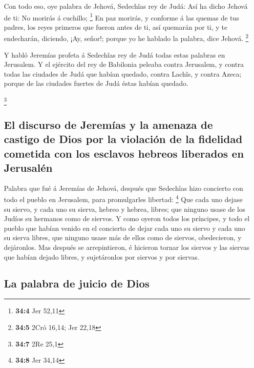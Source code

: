  Con todo eso, oye palabra de Jehová, Sedechîas rey de Judá:
Así ha dicho Jehová de ti: No morirás á cuchillo; \footnote{\textbf{34:4}
  Jer 52,11}  En paz morirás, y conforme á las quemas de tus
padres, los reyes primeros que fueron antes de ti, así quemarán por ti,
y te endecharán, diciendo, ¡Ay, señor!; porque yo he hablado la palabra,
dice Jehová. \footnote{\textbf{34:5} 2Cró 16,14; Jer 22,18}

 Y habló Jeremías profeta á Sedechîas rey de Judá todas
estas palabras en Jerusalem.  Y el ejército del rey de
Babilonia peleaba contra Jerusalem, y contra todas las ciudades de Judá
que habían quedado, contra Lachîs, y contra Azeca; porque de las
ciudades fuertes de Judá éstas habían quedado.

\footnote{\textbf{34:7} 2Re 25,1}

\hypertarget{el-discurso-de-jeremuxedas-y-la-amenaza-de-castigo-de-dios-por-la-violaciuxf3n-de-la-fidelidad-cometida-con-los-esclavos-hebreos-liberados-en-jerusaluxe9n}{%
\subsection{El discurso de Jeremías y la amenaza de castigo de Dios por
la violación de la fidelidad cometida con los esclavos hebreos liberados
en
Jerusalén}\label{el-discurso-de-jeremuxedas-y-la-amenaza-de-castigo-de-dios-por-la-violaciuxf3n-de-la-fidelidad-cometida-con-los-esclavos-hebreos-liberados-en-jerusaluxe9n}}

 Palabra que fué á Jeremías de Jehová, después que Sedechîas
hizo concierto con todo el pueblo en Jerusalem, para promulgarles
libertad: \footnote{\textbf{34:8} Jer 34,14}  Que cada uno
dejase su siervo, y cada uno su sierva, hebreo y hebrea, libres; que
ninguno usase de los Judíos su hermanos como de siervos.  Y
como oyeron todos los príncipes, y todo el pueblo que habían venido en
el concierto de dejar cada uno su siervo y cada uno su sierva libres,
que ninguno usase más de ellos como de siervos, obedecieron, y
dejáronlos.  Mas después se arrepintieron, é hicieron
tornar los siervos y las siervas que habían dejado libres, y
sujetáronlos por siervos y por siervas.

\hypertarget{la-palabra-de-juicio-de-dios}{%
\subsection{La palabra de juicio de
Dios}\label{la-palabra-de-juicio-de-dios}}

